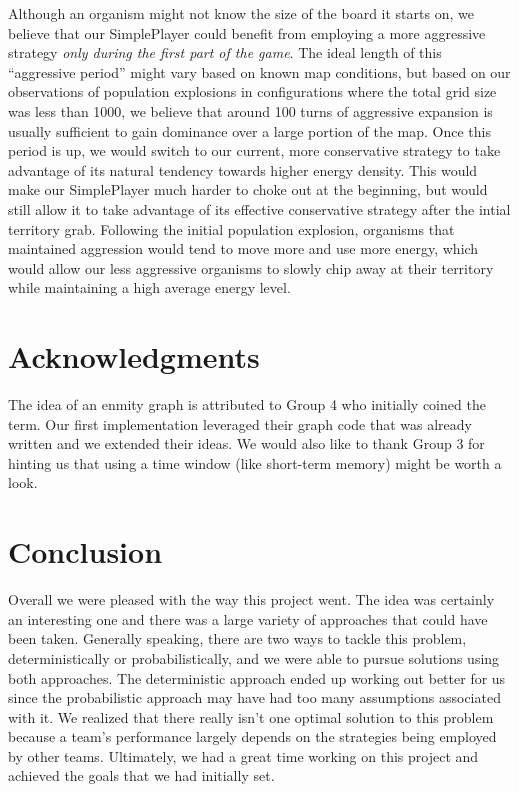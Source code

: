 \documentclass[
10pt, %
letterpaper, %
oneside, %
headinclude,footinclude, %
english
]{article}
\begin{document}
Although an organism might not know the size of the board it starts on, we believe that our SimplePlayer could benefit from employing a more aggressive strategy \textit{only during the first part of the game}. The ideal length of this ``aggressive period'' might vary based on known map conditions, but based on our observations of population explosions in configurations where the total grid size was less than 1000, we believe that around 100 turns of aggressive expansion is usually sufficient to gain dominance over a large portion of the map. Once this period is up, we would switch to our current, more conservative strategy to take advantage of its natural tendency towards higher energy density. This would make our SimplePlayer much harder to choke out at the beginning, but would still allow it to take advantage of its effective conservative strategy after the intial territory grab. Following the initial population explosion, organisms that maintained aggression would tend to move more and use more energy, which would allow our less aggressive organisms to slowly chip away at their territory while maintaining a high average energy level.

\section{Acknowledgments}

The idea of an enmity graph is attributed to Group 4 who initially coined the term. Our first implementation leveraged their graph code that was already written and we extended their ideas. We would also like to thank Group 3 for hinting us that using a time window (like short-term memory) might be worth a look.

\section{Conclusion}

Overall we were pleased with the way this project went. The idea was certainly an interesting one and there was a large variety of approaches that could have been taken. Generally speaking, there are two ways to tackle this problem, deterministically or probabilistically, and we were able to pursue solutions using both approaches. The deterministic approach ended up working out better for us since the probabilistic approach may have had too many assumptions associated with it. We realized that there really isn't one optimal solution to this problem because a team's performance largely depends on the strategies being employed by other teams. Ultimately, we had a great time working on this project and achieved the goals that we had initially set. 
\end{document}

